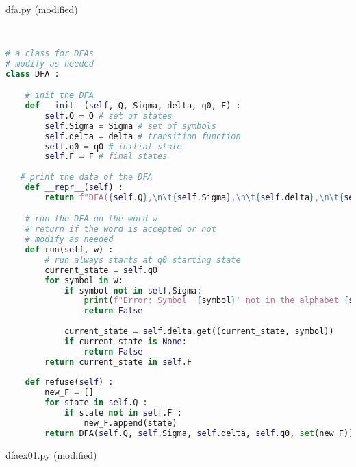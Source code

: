 \documentclass{article}
\theoremstyle{theorem}
\theoremstyle{definition}
\theoremstyle{remark}
\begin{document}
dfa.py (modified)
\begin{lstlisting}[language=Python]


# a class for DFAs
# modify as needed
class DFA :

    # init the DFA
    def __init__(self, Q, Sigma, delta, q0, F) : 
        self.Q = Q # set of states
        self.Sigma = Sigma # set of symbols
        self.delta = delta # transition function
        self.q0 = q0 # initial state
        self.F = F # final states
   
   # print the data of the DFA
    def __repr__(self) :
        return f"DFA({self.Q},\n\t{self.Sigma},\n\t{self.delta},\n\t{self.q0},\n\t{self.F})"

    # run the DFA on the word w
    # return if the word is accepted or not
    # modify as needed
    def run(self, w) :
        # run always starts at q0 starting state
        current_state = self.q0
        for symbol in w:
            if symbol not in self.Sigma:
                print(f"Error: Symbol '{symbol}' not in the alphabet {self.Sigma}.")
                return False
    
            current_state = self.delta.get((current_state, symbol))
            if current_state is None:
                return False
        return current_state in self.F
    
    def refuse(self) :
        new_F = []
        for state in self.Q :
            if state not in self.F :
                new_F.append(state)
        return DFA(self.Q, self.Sigma, self.delta, self.q0, set(new_F))

\end{lstlisting}
dfaex01.py (modified)
\end{document}
